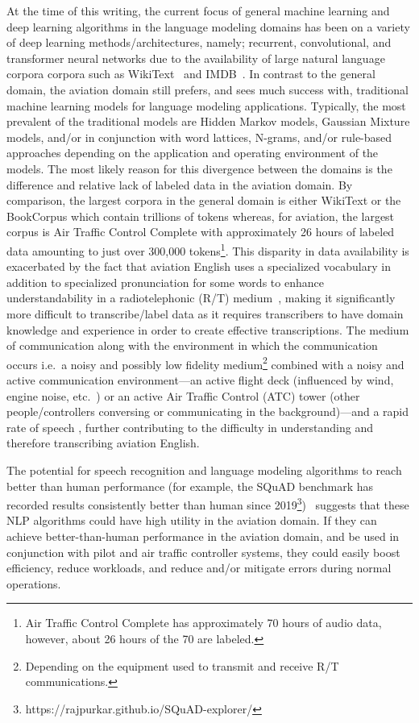 \documentclass[12pt]{article}
\begin{document}
At the time of this writing, the current focus of general machine learning and deep learning algorithms in the language modeling domains has been on a
variety of deep learning methods/architectures, namely; recurrent, convolutional, and transformer neural networks due to the availability of large
natural language corpora corpora such as WikiText~\cite{merity_pointer_2016} and IMDB~\cite{maas_learning_2011}. In contrast to the general domain,
the aviation domain still prefers, and sees much success with, traditional machine learning models for language modeling applications. Typically, the
most prevalent of the traditional models are Hidden Markov models, Gaussian Mixture models, and/or in conjunction with word lattices, N-grams, and/or
rule-based approaches depending on the application and operating environment of the models. The most likely reason for this divergence between the
domains is the difference and relative lack of labeled data in the aviation domain. By comparison, the largest corpora in the general domain is either
WikiText or the BookCorpus which contain trillions of tokens whereas, for aviation, the largest corpus is Air Traffic Control Complete with
approximately 26 hours of labeled data amounting to just over 300,000 tokens\footnote{Air Traffic Control Complete has approximately 70 hours of
    audio data, however, about 26 hours of the 70 are labeled.}. This disparity in data availability is exacerbated by the fact that aviation English
uses a specialized vocabulary in addition to specialized pronunciation for some words to enhance understandability in a radiotelephonic (R/T)
medium~\cite{paltridge_handbook_2013}, making it significantly more difficult to transcribe/label data as it requires transcribers to have domain
knowledge and experience in order to create effective transcriptions. The medium of communication along with the environment in which the
communication occurs i.e.~a noisy and possibly low fidelity medium\footnote{Depending on the equipment used to transmit and receive R/T
    communications.} combined with a noisy and active communication environment---an active flight deck (influenced by wind, engine noise, etc.~) or
an active Air Traffic Control (ATC) tower (other people/controllers conversing or communicating in the background)---and a rapid rate of speech
\cite{paltridge_handbook_2013}, further contributing to the difficulty in understanding and therefore transcribing aviation English.


The potential for speech recognition and language modeling algorithms to reach better than human performance (for example, the SQuAD benchmark has
recorded results consistently better than human since 2019\footnote{https://rajpurkar.github.io/SQuAD-explorer/})~\cite{zhang_ai_2022} suggests that
these NLP algorithms could have high utility in the aviation domain. If they can achieve better-than-human performance in the aviation domain, and be
used in conjunction with pilot and air traffic controller systems, they could easily boost efficiency, reduce workloads, and reduce and/or mitigate
errors during normal operations.
\end{document}
